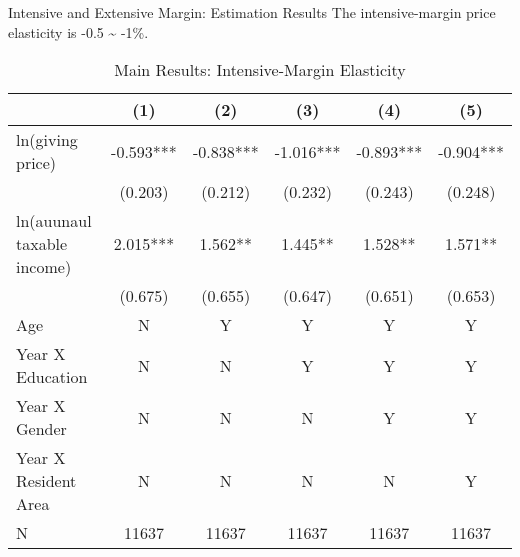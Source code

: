 \documentclass[
  ignorenonframetext,
]{beamer}
\begin{document}
\begin{frame}{Intensive and Extensive Margin: Estimation Results}
\protect\hypertarget{intensive-and-extensive-margin-estimation-results}{}
The intensive-margin price elasticity is -0.5 \textasciitilde{} -1\%.

\begin{table}

\caption{\label{tab:kableEstimateElasticityPart2Slide1}Main Results: Intensive-Margin Elasticity}
\centering
\fontsize{7}{9}\selectfont
\begin{tabular}[t]{lccccc}
\toprule
 & (1) & (2) & (3) & (4) & (5)\\
\midrule
ln(giving price) & -0.593*** & -0.838*** & -1.016*** & -0.893*** & -0.904***\\
 & (0.203) & (0.212) & (0.232) & (0.243) & (0.248)\\
ln(auunaul taxable income) & 2.015*** & 1.562** & 1.445** & 1.528** & 1.571**\\
 & (0.675) & (0.655) & (0.647) & (0.651) & (0.653)\\
Age & N & Y & Y & Y & Y\\
Year X Education & N & N & Y & Y & Y\\
Year X Gender & N & N & N & Y & Y\\
Year X Resident Area & N & N & N & N & Y\\
N & 11637 & 11637 & 11637 & 11637 & 11637\\
\bottomrule
\end{tabular}
\end{table}
\end{frame}
\end{document}
